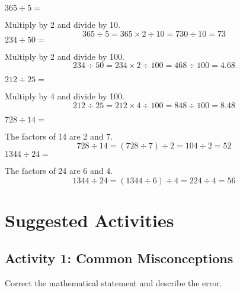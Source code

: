 \begin{example}
\Item $365\div 5=$

Multiply by 2 and divide by 10.
\begin{equation*}
365 \div 5 = 365 \times 2 \div 10 = 730 \div 10 = 73
\end{equation*}
\Item $234\div 50=$

Multiply by 2 and divide by 100.
\begin{equation*}
234 \div 50 = 234 \times 2 \div 100 = 468 \div 100 = 4.68
\end{equation*}

\Item $212\div 25=$

Multiply by 4 and divide by 100.
\begin{equation*}
212 \div 25 = 212 \times 4 \div 100 = 848 \div 100 = 8.48
\end{equation*}
\end{example}

\begin{example}
\Item $728\div 14=$

The factors of 14 are 2 and 7.
\begin{equation*}
728 \div 14 = (728 \div 7) \div 2 = 104 \div 2 = 52
\end{equation*}
\Item $1344\div 24=$

The factors of 24 are 6 and 4.
\begin{equation*}
1344 \div 24 = (1344 \div 6) \div 4 = 224 \div 4 = 56
\end{equation*}
\end{example}
\section*{Suggested Activities}
\subsection*{Activity 1: Common Misconceptions}
Correct the mathematical statement and describe the error.

